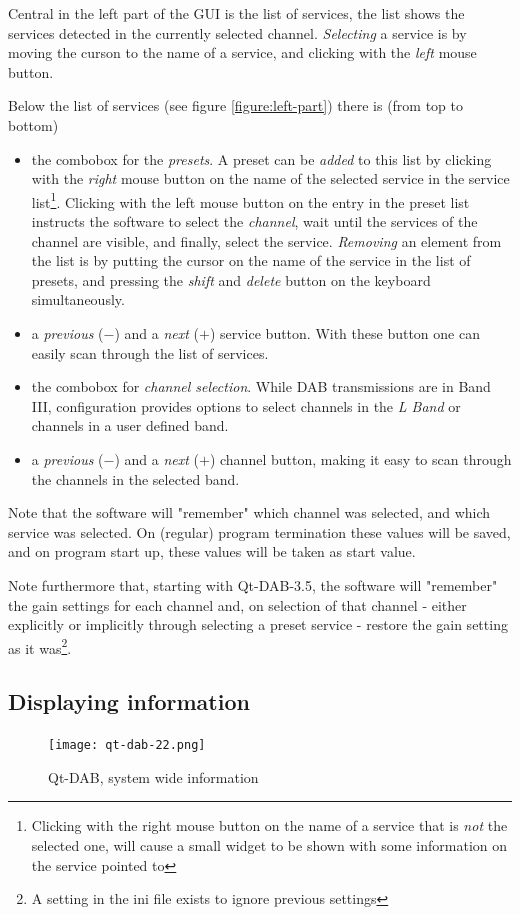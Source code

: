 \documentclass[12pt]{article}
\begin{document}
Central in the left part of the GUI is the list of services, the list shows
the services detected in the currently selected channel.
{\em Selecting} a service is by moving the curson to the name of
a service, and clicking with the {\em left} mouse button.
\par
Below the list of services (see figure \ref{figure:left-part})
there is (from top to bottom)
\begin{itemize}
\item the combobox for the {\em presets}. A preset can be {\em added}
to this list by clicking with the {\em right} mouse button on the name of
the selected service in the service list\footnote{Clicking with the
right mouse button on the name of a service that is {\em not} the
selected one, will cause a small widget to be shown with
some information on the service pointed to}. Clicking with the left
mouse button on the entry in the preset list instructs the software
to select the {\em channel}, wait until the services of the channel
are visible, and finally, select the service.
{\em Removing} an element from the list is
by putting the cursor on the name of the service in the list of presets,
and pressing the {\em shift} and {\em delete} button on the keyboard
simultaneously.
\item a {\em previous} ($-$) and a {\em next} ($+$) service button.
With these button one can easily scan through the list of services.
\item the combobox for {\em channel selection}.
While DAB transmissions are in Band III, configuration provides
options to select channels in the {\em L Band}
or channels in a user defined band.
\item a {\em previous} ($-$) and a {\em next} ($+$) channel button,
making it easy to scan through the channels in the selected band.
\end{itemize}
Note that the software will "remember" which channel was selected, and
which service was selected. On (regular) program termination
these values will be saved, and on program start up, these values will
be taken as start value.
\par
Note furthermore that, starting with Qt-DAB-3.5, the software will "remember"
the gain settings for each channel and, on selection of that channel - either
explicitly or implicitly through selecting a preset service - restore
the gain setting as it was\footnote{A setting in the ini file exists to
ignore previous settings}.
\subsection{Displaying information}
\begin{figure}[htp]
\centering
\texttt{[image: qt-dab-22.png]}
\caption{Qt-DAB, system wide information}
\label{figure:system-wide}
\end{figure}
\end{document}

